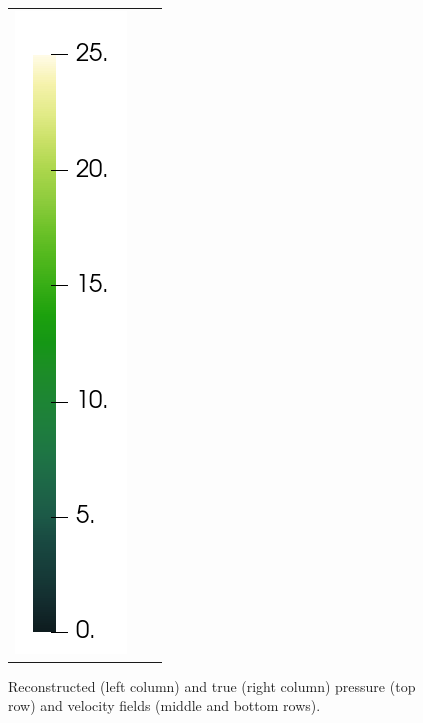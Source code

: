 \begin{figure}[H]
\begin{center}
\begin{tabular}[c]{c c c}
			\includegraphics[scale=.18]{velocityColorBar.png}
		\end{tabular}
	\caption{Reconstructed (left column) and true (right column) pressure (top row) and velocity fields (middle and bottom rows).}
	\end{center}
\end{figure}
